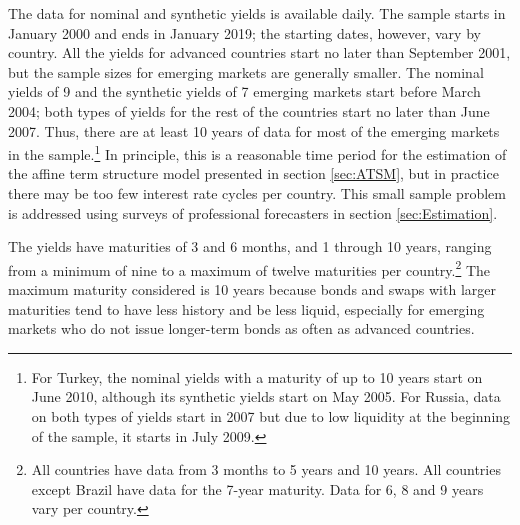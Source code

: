 {The data for nominal and synthetic yields is available daily. 
The sample starts in January 2000 and ends in January 2019; the starting dates, however,
vary by country.
All the yields for advanced countries start no later than September 2001, but the sample sizes for emerging markets are generally smaller.
The nominal yields of 9 and the synthetic yields of 7 emerging markets start before March 2004; both types of yields for the rest of the countries start no later than June 2007.
Thus, there are at least 10 years of data for most of the emerging markets in the sample.\footnote{ For Turkey, the nominal yields with a maturity of up to 10 years start on June 2010, although its synthetic yields start on May 2005. For Russia, data on both types of yields start in 2007 but due to low liquidity at the beginning of the sample, it starts in July 2009.}
In principle, this is a reasonable time period for the estimation of the affine term structure model presented in section \ref{sec:ATSM}, but in practice there may be too few interest rate cycles per country.
This small sample problem is addressed using surveys of professional forecasters in section \ref{sec:Estimation}. 

The yields have maturities of 3 and 6 months, and 1 through 10 years, ranging from a minimum of nine to a maximum of twelve maturities per country.\footnote{ All countries have data from 3 months to 5 years and 10 years. All countries except Brazil have data for the 7-year maturity. Data for 6, 8 and 9 years vary per country.} 
The maximum maturity considered is 10 years because bonds and swaps with larger maturities tend to have less history and be less liquid, especially for emerging markets who do not issue longer-term bonds as often as advanced countries.
%	

}

